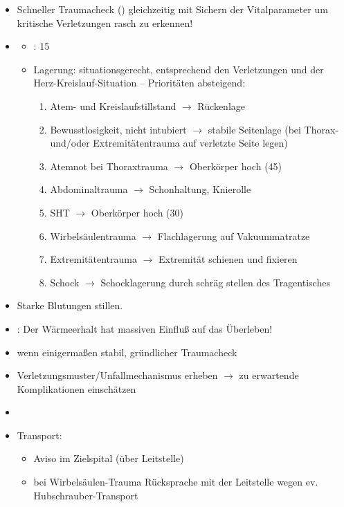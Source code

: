 {    
\begin{itemize}
  \item Schneller Traumacheck () gleichzeitig
  mit Sichern der Vitalparameter um kritische Verletzungen rasch zu
  erkennen!
  \item \TxMassVitBes
  \begin{itemize}
    \item {}: 15\LMin
    \item Lagerung: situationsgerecht, entsprechend den Verletzungen
    und der Herz-Kreislauf-Situation -- Prioritäten absteigend:
    {
    \scriptsize
    \begin{enumerate}
      \item Atem- und Kreislaufstillstand $\rightarrow$ Rückenlage
      \item Bewusstlosigkeit, nicht intubiert $\rightarrow$ stabile Seitenlage 
      (bei Thorax- und/oder Extremitätentrauma auf verletzte Seite legen)
      \item Atemnot bei Thoraxtrauma $\rightarrow$ Oberkörper hoch (45\textdegree)
      \item Abdominaltrauma $\rightarrow$ Schonhaltung, Knierolle
      \item SHT $\rightarrow$ Oberkörper hoch (30\textdegree)
      \item Wirbelsäulentrauma $\rightarrow$ Flachlagerung auf Vakuummatratze
      \item Extremitätentrauma $\rightarrow$ Extremität schienen und fixieren
      \item Schock $\rightarrow$ Schocklagerung durch schräg stellen des Tragentisches
    \end{enumerate}
    }
  \end{itemize}
  \item Starke Blutungen stillen.
  \item {}: Der Wärmeerhalt hat massiven Einfluß auf das
  Überleben!
  \item wenn einigermaßen stabil, gründlicher  Traumacheck
  \item Verletzungsmuster/Unfallmechanismus erheben $\rightarrow$ zu 
  erwartende Komplikationen einschätzen
  \item {}
  \item Transport:
  \begin{itemize}
    \item Aviso im Zielspital (über Leitstelle)
    \item bei Wirbelsäulen-Trauma Rücksprache mit der Leitstelle wegen ev. Hubschrauber-Transport
  \end{itemize}
\end{itemize}
}

